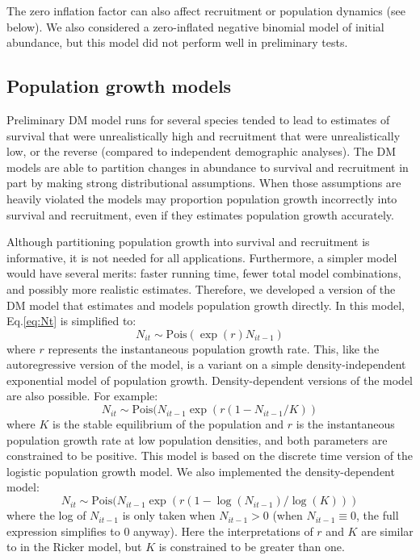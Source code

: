 \documentclass[12pt]{article}
\begin{document}
The zero inflation factor can also affect
recruitment or population dynamics (see below).
We also considered a zero-inflated negative binomial model of initial
abundance, but this model did not perform well in preliminary tests.

\subsection{Population growth models}

Preliminary DM model runs for several species tended to lead to
estimates of survival that were unrealistically high and recruitment
that were unrealistically low, or the reverse (compared to independent
demographic analyses).  The DM models are able to partition changes in
abundance to survival and recruitment in part by making strong
distributional assumptions. %
When those assumptions are heavily violated the models may proportion
population growth incorrectly into survival and recruitment, even if
they estimates population growth accurately.

Although partitioning population growth into survival and recruitment
is informative, it is not needed for all applications.  Furthermore, a
simpler model would have several merits: faster running time, fewer
total model combinations, and possibly more realistic estimates.
Therefore, we developed a version of the DM model that estimates and
models population growth directly.  In this model, Eq.\ref{eq:Nt} is
simplified to:
\begin{equation}
  N_{it} \sim \text{Pois}(\exp(r)N_{it-1})
\label{eq:exp}
\end{equation}
where $r$ represents the instantaneous population growth rate.  This,
like the autoregressive version of the model, is a variant on a simple
density-independent exponential model of population growth.
Density-dependent versions of the model are also possible.  For
example:
\begin{equation}
  N_{it} \sim \text{Pois}(N_{it-1}\exp(r(1-N_{it-1}/K))
\label{eq:rick}
\end{equation}
where $K$ is the stable equilibrium of the population and $r$ is the
instantaneous population growth rate at low population densities, and
both parameters are constrained to be positive.  This model is based
on the \citet{ricker:1954} discrete time version of the logistic population
growth model.  We also implemented the \citet{gompertz:1825} density-dependent
model:
\begin{equation}
  N_{it} \sim \text{Pois}(N_{it-1}\exp(r(1-\log(N_{it-1})/\log(K)))
\label{eq:gomp}
\end{equation}
where the log of $N_{it-1}$ is only taken when $N_{it-1}>0$
(when $N_{it-1} \equiv 0$, the full expression simplifies to 0 anyway).  Here
the interpretations of $r$ and $K$ are similar to in the Ricker model, but
$K$ is constrained to be greater than one.
\end{document}
